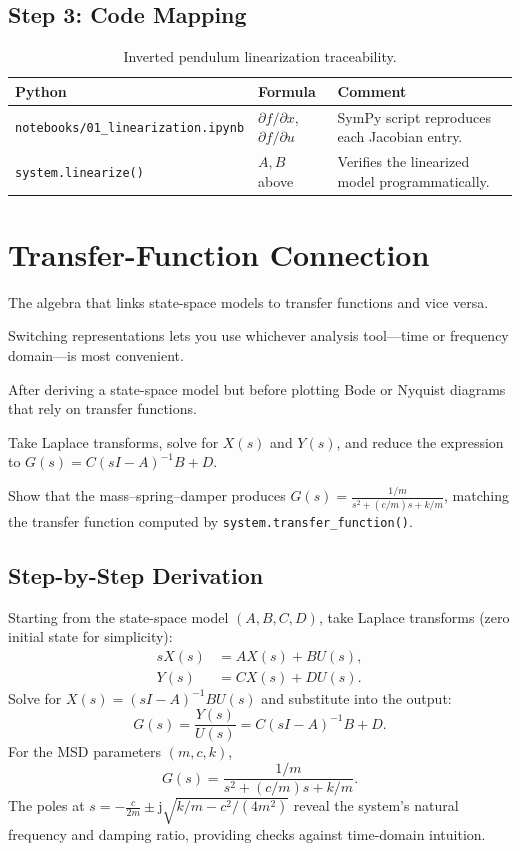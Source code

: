 \subsection{Step 3: Code Mapping}
\begin{table}[h]
    \centering
    \small
    \renewcommand{\arraystretch}{1.2}
    \begin{tabularx}{\linewidth}{|>{\raggedright\arraybackslash}p{4cm}|X|X|}
        \hline
        \textbf{Python} & \textbf{Formula} & \textbf{Comment} \\
        \hline
        \texttt{notebooks/01\_linearization.ipynb} & $\partial f/\partial x$, $\partial f/\partial u$ & SymPy script reproduces each Jacobian entry. \\
        \hline
        \texttt{system.linearize()} & $A, B$ above & Verifies the linearized model programmatically. \\
        \hline
    \end{tabularx}
    \caption{Inverted pendulum linearization traceability.}
\end{table}

\section{Transfer-Function Connection}
\begin{beginnerguide}
    \item[\textbf{What?}] The algebra that links state-space models to transfer functions and vice versa.
    \item[\textbf{Why?}] Switching representations lets you use whichever analysis tool—time or frequency domain—is most convenient.
    \item[\textbf{When?}] After deriving a state-space model but before plotting Bode or Nyquist diagrams that rely on transfer functions.
    \item[\textbf{How?}] Take Laplace transforms, solve for $X(s)$ and $Y(s)$, and reduce the expression to $G(s)=C(sI-A)^{-1}B + D$.
    \item[\textbf{Example}] Show that the mass--spring--damper produces $G(s)=\frac{1/m}{s^2+(c/m)s+k/m}$, matching the transfer function computed by \texttt{system.transfer\_function()}.
\end{beginnerguide}
\subsection{Step-by-Step Derivation}
Starting from the state-space model $(A,B,C,D)$, take Laplace transforms (zero initial state for simplicity):
\begin{align*}
    s X(s) &= A X(s) + B U(s),\\
    Y(s) &= C X(s) + D U(s).
\end{align*}
Solve for $X(s) = (s I - A)^{-1} B U(s)$ and substitute into the output:
\[
    G(s) = \frac{Y(s)}{U(s)} = C (s I - A)^{-1} B + D.
\]
For the MSD parameters $(m,c,k)$,
\[
    G(s) = \frac{1/m}{s^2 + (c/m) s + k/m}.
\]
The poles at $s = -\tfrac{c}{2m} \pm \mathrm{j} \sqrt{k/m - c^2/(4m^2)}$ reveal the system's natural frequency and damping ratio, providing checks against time-domain intuition.

